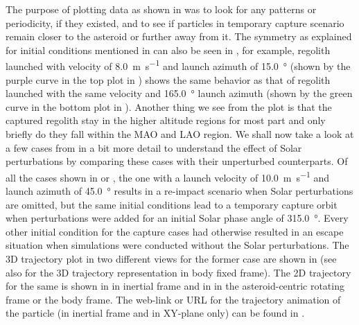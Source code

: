 The purpose of plotting data as shown in  was to look for any patterns or periodicity, if they existed, and to see if particles in temporary capture scenario remain closer to the asteroid or further away from it. The symmetry as explained for initial conditions mentioned in  can also be seen in , for example, regolith launched with velocity of \SI{8.0}{\metre\per\second} and launch azimuth of \SI{15.0}{\degree} (shown by the purple curve in the top plot in ) shows the same behavior as that of regolith launched with the same velocity and \SI{165.0}{\degree} launch azimuth (shown by the green curve in the bottom plot in ). Another thing we see from the plot is that the captured regolith stay in the higher altitude regions for most part and only briefly do they fall within the \gls{MAO} and \gls{LAO} region. We shall now take a look at a few cases from  in a bit more detail to understand the effect of Solar perturbations by comparing these cases with their unperturbed counterparts.
%
\newline\newline
%
Of all the cases shown in  or , the one with a launch velocity of \SI{10.0}{\metre\per\second} and launch azimuth of \SI{45.0}{\degree} results in a re-impact scenario when Solar perturbations are omitted, but the same initial conditions lead to a temporary capture orbit when perturbations were added for an initial Solar phase angle of \SI{315.0}{\degree}. Every other initial condition for the capture cases had otherwise resulted in an escape situation when simulations were conducted without the Solar perturbations. The 3D trajectory plot in two different views for the former case are shown in  (see  also for the 3D trajectory representation in body fixed frame). The 2D trajectory for the same is shown in  in inertial frame and in  in the asteroid-centric rotating frame or the body frame. The web-link or URL for the trajectory animation of the particle (in inertial frame and in XY-plane only) can be found in .
